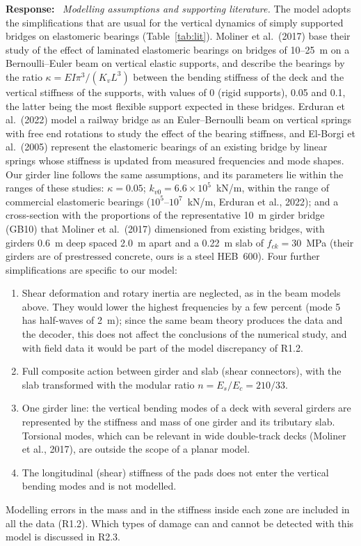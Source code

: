 \documentclass[11pt]{article}
\newenvironment{response}{\par\smallskip\noindent\color{resp}\textbf{Response:}\ }{\par}
\begin{document}
\begin{response}
\textit{Modelling assumptions and supporting literature.} The model adopts the simplifications that are usual for the
vertical dynamics of simply supported bridges on elastomeric bearings (Table~\ref{tab:lit}). Moliner et al.\ (2017) base
their study of the effect of laminated elastomeric bearings on bridges of 10--25~m on a Bernoulli--Euler beam on
vertical elastic supports, and
describe the bearings by the ratio $\kappa=EI\pi^3/(K_vL^3)$ between the bending stiffness of the deck and the vertical
stiffness of the supports, with values of 0 (rigid supports), 0.05 and 0.1, the latter being the most flexible support
expected in these bridges. Erduran et al.\ (2022) model a railway bridge as an Euler--Bernoulli beam on vertical springs
with free end rotations to study the effect of the bearing stiffness, and El-Borgi et al.\ (2005) represent the
elastomeric bearings of an existing bridge by linear springs whose stiffness is updated from measured frequencies and
mode shapes. Our girder line follows the same assumptions, and its parameters lie within the ranges of these studies:
$\kappa=0.05$; $k_{v0}=6.6\times10^{5}$~kN/m, within the range of commercial elastomeric bearings
($10^{5}$--$10^{7}$~kN/m, Erduran et al., 2022); and a cross-section with the proportions of the representative 10~m
girder bridge (GB10) that Moliner et al.\ (2017) dimensioned from existing bridges, with girders 0.6~m deep spaced
2.0~m apart and a 0.22~m slab of $f_{ck}=30$~MPa (their girders are of prestressed concrete, ours is a steel HEB~600).
Four further simplifications are specific to our model:
\begin{enumerate}[label=(\roman*),leftmargin=*]
\item Shear deformation and rotary inertia are neglected, as in the beam models above. They would lower the highest
frequencies by a few percent (mode 5 has half-waves of 2~m); since the same beam theory produces the data and the
decoder, this does not affect the conclusions of the numerical study, and with field data it would be part of the model
discrepancy of R1.2.
\item Full composite action between girder and slab (shear connectors), with the slab transformed with the modular
ratio $n=E_s/E_c=210/33$.
\item One girder line: the vertical bending modes of a deck with several girders are represented by the stiffness and
mass of one girder and its tributary slab. Torsional modes, which can be relevant in wide double-track decks (Moliner
et al., 2017), are outside the scope of a planar model.
\item The longitudinal (shear) stiffness of the pads does not enter the vertical bending modes and is not modelled.
\end{enumerate}
Modelling errors in the mass and in the stiffness inside each zone are included in all the data (R1.2). Which types of
damage can and cannot be detected with this model is discussed in R2.3.


\end{response}
\end{document}
